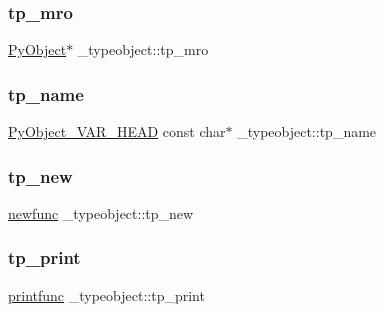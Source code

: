 \subsubsection{\texorpdfstring{tp\_mro}{tp\_mro}}
{\footnotesize\ttfamily \mbox{\hyperlink{_python27_2object_8h_aadc84ac7aed2cfa6f20c25f62bf3dac7}{Py\+Object}}$\ast$ \+\_\+typeobject\+::tp\+\_\+mro}

\mbox{\label{struct__typeobject_ac5e735ef4e5e666b94668cbed5a08901}} 
\subsubsection{\texorpdfstring{tp\_name}{tp\_name}}
{\footnotesize\ttfamily \mbox{\hyperlink{_python27_2object_8h_aa0eba161a76be8710b3de325c2e7f9e2}{Py\+Object\+\_\+\+V\+A\+R\+\_\+\+H\+E\+AD}} const char$\ast$ \+\_\+typeobject\+::tp\+\_\+name}

\mbox{\label{struct__typeobject_a64c53edf53481e7d4e87d716c8a9e920}} 
\subsubsection{\texorpdfstring{tp\_new}{tp\_new}}
{\footnotesize\ttfamily \mbox{\hyperlink{_python27_2object_8h_ae0589d0aee9077cb7eac7f308dd932c3}{newfunc}} \+\_\+typeobject\+::tp\+\_\+new}

\mbox{\label{struct__typeobject_a9b6d17094356175c542e007464cae33f}} 
\subsubsection{\texorpdfstring{tp\_print}{tp\_print}}
{\footnotesize\ttfamily \mbox{\hyperlink{_python27_2object_8h_a8f688973092faa2442e9d5210aab8aae}{printfunc}} \+\_\+typeobject\+::tp\+\_\+print}

\mbox{\label{struct__typeobject_a3eb42d25116ad9a0ee140669e7a9a50c}} 
